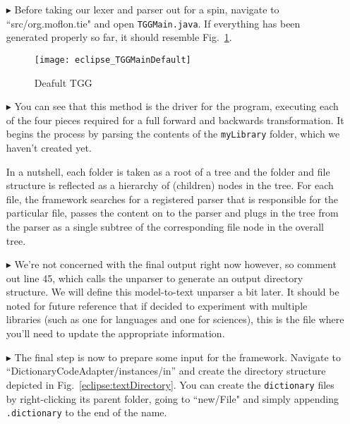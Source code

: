 \begin{itemize}


\item[$\blacktriangleright$] Before taking our lexer and parser out for a spin, navigate to ``src/org.moflon.tie" and open \texttt{TGGMain.java}. If everything
has been generated properly so far, it should resemble Fig.~\ref{eclipse:defaultTGGMain}.

\begin{figure}[!htbp]
\begin{center}
 \texttt{[image: eclipse\_TGGMainDefault]}
  \caption{Deafult TGG}
  \label{eclipse:defaultTGGMain}
\end{center}
\end{figure}

\item[$\blacktriangleright$] You can see that this method is the driver for the program, executing each of the four pieces required for a full forward and
backwards transformation. It begins the process by parsing the contents of the \texttt{myLibrary} folder, which we haven't created yet. 

\vspace{0.5cm}

In a nutshell, each folder is taken as a root of a tree and the folder and file structure is reflected as a hierarchy of (children) nodes in the tree.
For each file, the framework searches for a registered parser that is responsible for the particular file, passes the content on to the parser and plugs in the
tree from the parser as a single subtree of the corresponding file node in the overall tree.  

\newpage

\item[$\blacktriangleright$] We're not concerned with the final output right now however, so comment out line 45, which calls the unparser to generate an output
directory structure. We will define this model-to-text unparser a bit later. It should be noted for future reference that if decided to experiment with multiple
libraries (such as one for languages and one for sciences), this is the file where you'll need to update the appropriate information.

\item[$\blacktriangleright$] The final step is now to prepare some input for the framework. Navigate to ``DictionaryCodeAdapter/instances/in'' and create the
directory structure depicted in Fig.~\ref{eclipse:textDirectory}. You can create the \texttt{dictionary} files by right-clicking its parent folder, going to
``new/File" and simply appending \texttt{.dictionary} to the end of the name. 


\end{itemize}

